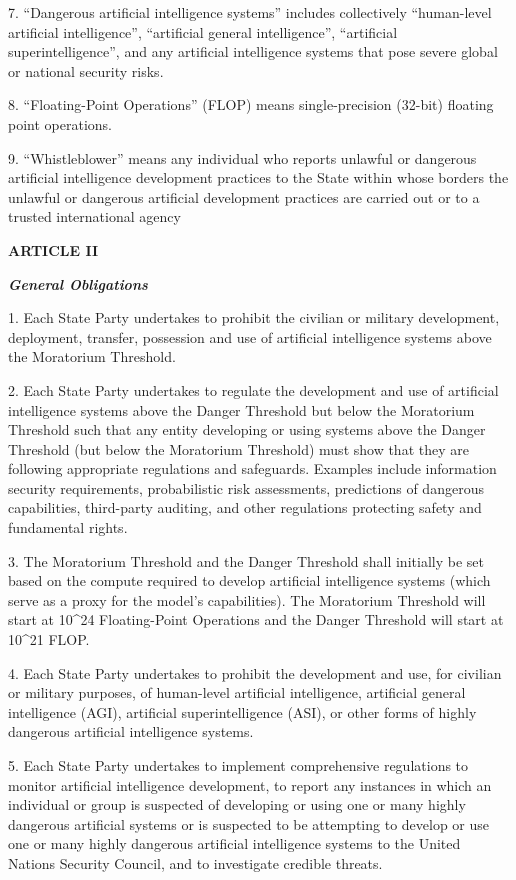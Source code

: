 \documentclass[12pt,a4paper]{article}
\begin{document}
7. “Dangerous artificial intelligence systems” includes collectively “human-level artificial intelligence”, “artificial general intelligence”, “artificial superintelligence”, and any artificial intelligence systems that pose severe global or national security risks.

8. “Floating-Point Operations” (FLOP) means single-precision (32-bit) floating point operations.

9. “Whistleblower” means any individual who reports unlawful or dangerous artificial intelligence development practices to the State within whose borders the unlawful or dangerous artificial development practices are carried out or to a trusted international agency

 \begin{center}
    
\textbf{{ARTICLE II}}

\textit{\textbf{General Obligations}}
\end{center}

1. Each State Party undertakes to prohibit the civilian or military development, deployment, transfer, possession and use of artificial intelligence systems above the Moratorium Threshold. 

2. Each State Party undertakes to regulate the development and use of artificial intelligence systems above the Danger Threshold but below the Moratorium Threshold such that any entity developing or using systems above the Danger Threshold (but below the Moratorium Threshold) must show that they are following appropriate regulations and safeguards. Examples include information security requirements, probabilistic risk assessments, predictions of dangerous capabilities, third-party auditing, and other regulations protecting safety and fundamental rights.

3. The Moratorium Threshold and the Danger Threshold shall initially be set based on the compute required to develop artificial intelligence systems (which serve as a proxy for the model's capabilities). The Moratorium Threshold will start at 10\^{}24 Floating-Point Operations and the Danger Threshold will start at 10\^{}21 FLOP. 

4. Each State Party undertakes to prohibit the development and use, for civilian or military purposes, of human-level artificial intelligence, artificial general intelligence (AGI), artificial superintelligence (ASI), or other forms of highly dangerous artificial intelligence systems. 

5. Each State Party undertakes to implement comprehensive regulations to monitor artificial intelligence development, to report any instances in which an individual or group is suspected of developing or using one or many highly dangerous artificial systems or is suspected to be attempting to develop or use one or many highly dangerous artificial intelligence systems to the United Nations Security Council, and to investigate credible threats.
\end{document}
